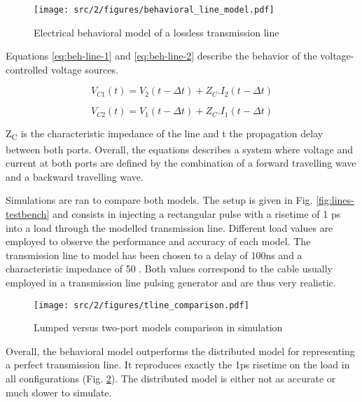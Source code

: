 \begin{figure}[!h]
  \centering
  \texttt{[image: src/2/figures/behavioral\_line\_model.pdf]}
  \caption{Electrical behavioral model of a lossless transmission line}
  \label{fig:beh-line-model}
\end{figure}

Equations \ref{eq:beh-line-1} and \ref{eq:beh-line-2} describe the behavior of the voltage-controlled voltage sources.

\begin{equation}
V_{C1}(t) = V_{2}(t - \Delta t) + Z_{C}.I_{2}(t - \Delta t)
\label{eq:beh-line-1}
\end{equation}

\begin{equation}
V_{C2}(t) = V_{1}(t - \Delta t) + Z_{C}.I_{1}(t - \Delta t)
\label{eq:beh-line-2}
\end{equation}

Z\textsubscript{C} is the characteristic impedance of the line and \textDelta{}t the propagation delay between both ports.
Overall, the equations describes a system where voltage and current at both ports are defined by the combination of a forward travelling wave and a backward travelling wave.

Simulations are ran to compare both models.
The setup is given in Fig. \ref{fig:lines-testbench} and consists in injecting a rectangular pulse with a risetime of 1 ps into a load through the modelled transmission line.
Different load values are employed to observe the performance and accuracy of each model.
The transmission line to model has been chosen to a delay of 100ns and a characteristic impedance of 50 \textOmega.
Both values correspond to the cable usually employed in a transmission line pulsing generator and are thus very realistic.


\begin{figure}[!h]
  \centering
  \texttt{[image: src/2/figures/tline\_comparison.pdf]}
  \caption{Lumped versus two-port models comparison in simulation}
  \label{fig:lines-simulations}
\end{figure}


Overall, the behavioral model outperforms the distributed model for representing a perfect transmission line.
It reproduces exactly the 1ps risetime on the load in all configurations (Fig. \ref{fig:lines-simulations}).
The distributed model is either not as accurate or much slower to simulate.

